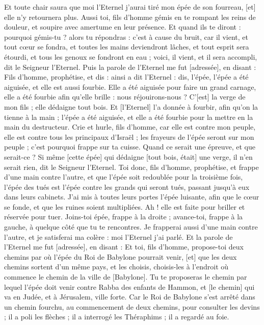 \begin{multicols}{2}
Et toute chair saura que moi l'Eternel j'aurai tiré mon épée de son fourreau, [et] elle n'y retournera plus.
Aussi toi, fils d'homme gémis en te rompant les reins de douleur, et soupire avec amertume en leur présence.
Et quand ils te diront : pourquoi gémis-tu ? alors tu répondras : c'est à cause du bruit, car il vient, et tout cœur se fondra, et toutes les mains deviendront lâches, et tout esprit sera étourdi, et tous les genoux se fondront en eau ; voici, il vient, et il sera accompli, dit le Seigneur l'Eternel.
Puis la parole de l'Eternel me fut [adressée], en disant :
Fils d'homme, prophétise, et dis : ainsi a dit l'Eternel : dis, l'épée, l'épée a été aiguisée, et elle est aussi fourbie.
Elle a été aiguisée pour faire un grand carnage, elle a été fourbie afin qu'elle brille : nous réjouirons-nous ? C'[est] la verge de mon fils ; elle dédaigne tout bois.
Et [l'Eternel] l'a donnée à fourbir, afin qu'on la tienne à la main ; l'épée a été aiguisée, et elle a été fourbie pour la mettre en la main du destructeur.
Crie et hurle, fils d'homme, car elle est contre mon peuple, elle est contre tous les principaux d'Israël ; les frayeurs de l'épée seront sur mon peuple ; c'est pourquoi frappe sur ta cuisse.
Quand ce serait une épreuve, et que serait-ce ? Si même [cette épée] qui dédaigne [tout bois, était] une verge, il n'en serait rien, dit le Seigneur l'Eternel.
Toi donc, fils d'homme, prophétise, et frappe d'une main contre l'autre, et que l'épée soit redoublée pour la troisième fois, l'épée des tués est l'épée contre les grands qui seront tués, passant jusqu'à eux dans leurs cabinets.
J'ai mis à toutes leurs portes l'épée luisante, afin que le cœur se fonde, et que les ruines soient multipliées. Ah ! elle est faite pour briller et réservée pour tuer.
Joins-toi épée, frappe à la droite ; avance-toi, frappe à la gauche, à quelque côté que tu te rencontres.
Je frapperai aussi d'une main contre l'autre, et je satisferai ma colère : moi l'Eternel j'ai parlé.
Et la parole de l'Eternel me fut [adressée], en disant :
Et toi, fils d'homme, propose-toi deux chemins par où l'épée du Roi de Babylone pourrait venir, [et] que les deux chemins sortent d'un même pays, et les choisis, choisis-les à l'endroit où commence le chemin de la ville de [Babylone].
Tu te proposeras le chemin par lequel l'épée doit venir contre Rabba des enfants de Hammon, et [le chemin] qui va en Judée, et à Jérusalem, ville forte.
Car le Roi de Babylone s'est arrêté dans un chemin fourchu, au commencement de deux chemins, pour consulter les devins ; il a poli les flèches ; il a interrogé les Théraphims ; il a regardé au foie.

\end{multicols}
